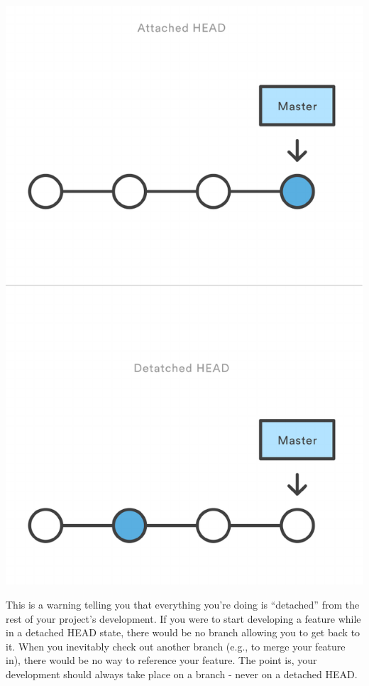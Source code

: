 \documentclass{article}
\begin{document}
\begin{center}
\includegraphics[scale=0.5]{figures/09.pdf}
\end{center}

This is a warning telling you that everything you're doing is
``detached'' from the rest of your project's development. If you were to
start developing a feature while in a detached HEAD state, there would
be no branch allowing you to get back to it. When you inevitably check
out another branch (e.g., to merge your feature in), there would be no
way to reference your feature. The point is, your development should
always take place on a branch - never on a detached HEAD. 
\end{document}
